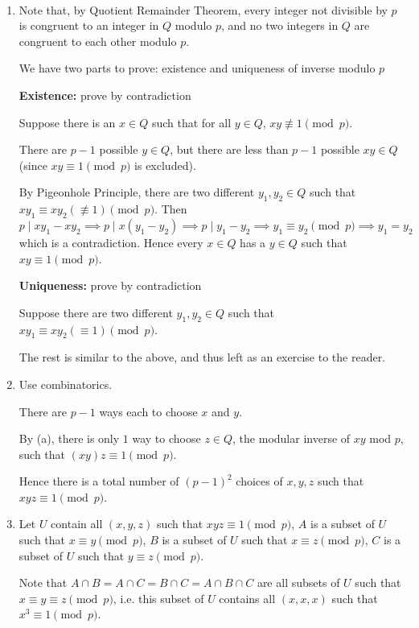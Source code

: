 \begin{solution} \
\begin{enumerate}[label=(\alph*)]
\item Note that, by Quotient Remainder Theorem, every integer not divisible by $p$ is congruent to an integer in $Q$ modulo $p$, and no two integers in $Q$ are congruent to each other modulo $p$.

We have two parts to prove: existence and uniqueness of inverse modulo $p$

\textbf{Existence:} prove by contradiction

Suppose there is an $x\in Q$ such that for all $y\in Q$, $xy\not\equiv1\pmod p$.

There are $p-1$ possible $y\in Q$, but there are less than $p-1$ possible $xy\in Q$ (since $xy\equiv1\pmod p$ is excluded).

By Pigeonhole Principle, there are two different $y_1,y_2\in Q$ such that $xy_1\equiv xy_2(\not\equiv1)\pmod p$. Then
\[ p\mid xy_1-xy_2 \implies p\mid x(y_1-y_2) \implies p\mid y_1-y_2 \implies y_1\equiv y_2\pmod p \implies y_1=y_2 \]
which is a contradiction. Hence every $x\in Q$ has a $y\in Q$ such that $xy\equiv1\pmod p$.

\textbf{Uniqueness:} prove by contradiction

Suppose there are two different $y_1,y_2\in Q$ such that $xy_1\equiv xy_2(\equiv1)\pmod p$.

The rest is similar to the above, and thus left as an exercise to the reader.

\item Use combinatorics.

There are $p-1$ ways each to choose $x$ and $y$.

By (a), there is only $1$ way to choose $z\in Q$, the modular inverse of $xy$ mod $p$, such that $(xy)z\equiv1\pmod p$.

Hence there is a total number of $(p-1)^2$ choices of $x,y,z$ such that $xyz\equiv1\pmod p$.

\item Let $U$ contain all $(x,y,z)$ such that $xyz\equiv1\pmod p$, $A$ is a subset of $U$ such that $x\equiv y\pmod p$, $B$ is a subset of $U$ such that $x\equiv z\pmod p$, $C$ is a subset of $U$ such that $y\equiv z\pmod p$.

Note that $A\cap B=A\cap C=B\cap C=A\cap B\cap C$ are all subsets of $U$ such that $x\equiv y\equiv z\pmod p$, i.e. this subset of $U$ contains all $(x,x,x)$ such that $x^3\equiv1\pmod p$.


\end{enumerate}
\end{solution}
